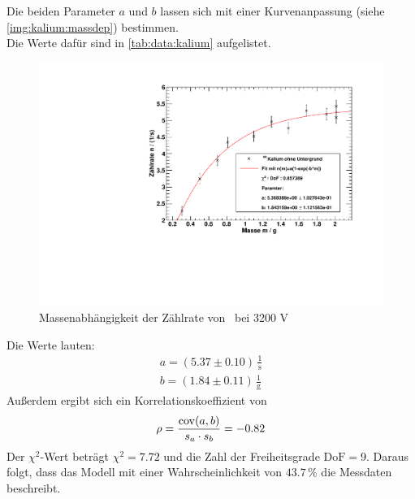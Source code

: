 Die beiden Parameter $a$ und $b$ lassen sich mit einer Kurvenanpassung (siehe \autoref{img:kalium:massdep}) bestimmen. \\
Die Werte dafür sind in \autoref{tab:data:kalium} aufgelistet.
 
\begin{figure}[H]
\begin{center}
  \includegraphics[width=15cm]{../img/Kalium40_Massenabhaengigkeit.pdf}
  \caption[Massenabhängigkeit der Zählrate von \kalium]{Massenabhängigkeit der Zählrate von \kalium\, bei 3200 V}
  \label{img:kalium:massdep}
\end{center}
\end{figure}
Die Werte lauten:
\begin{gather}
  a = (5.37 \pm 0.10)\,\frac{1}{\text{s}} \\
  b = (1.84 \pm 0.11)\,\frac{1}{\text{g}} 
\end{gather}
Außerdem ergibt sich ein Korrelationskoeffizient von
\begin{equation}
  \rho = \frac{\operatorname{cov}(a, b)}{s_a \cdot s_b} = -0.82
\end{equation}
Der $\chi^2$-Wert beträgt $\chi^2 =7.72$ und die Zahl der Freiheitsgrade $\text{DoF} = 9$. Daraus folgt, dass das Modell mit einer 
Wahrscheinlichkeit von $43.7\,\%$ die Messdaten beschreibt.

